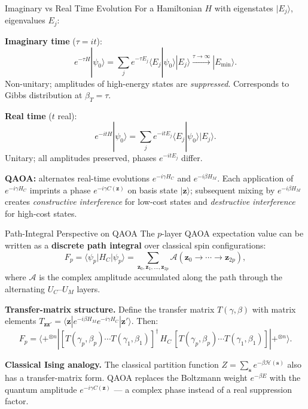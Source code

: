 \documentclass{beamer}
\begin{document}
\begin{frame}
\begin{frame}{Imaginary vs Real Time Evolution}
For a Hamiltonian $H$ with eigenstates $|E_j\rangle$,
eigenvalues $E_j$:

\medskip

\textbf{Imaginary time} ($\tau = it$):
\[
e^{-\tau H}|\psi_0\rangle
= \sum_j e^{-\tau E_j}\langle E_j|\psi_0\rangle|E_j\rangle
\xrightarrow{\tau\to\infty} |E_{\min}\rangle.
\]
Non-unitary; amplitudes of high-energy states are \emph{suppressed}.
Corresponds to Gibbs distribution at $\beta_T = \tau$.

\medskip

\textbf{Real time} ($t$ real):
\[
e^{-itH}|\psi_0\rangle = \sum_j e^{-itE_j}\langle E_j|\psi_0\rangle|E_j\rangle.
\]
Unitary; all amplitudes preserved, phases $e^{-itE_j}$ differ.

\medskip

\textbf{QAOA:} alternates real-time evolutions $e^{-i\gamma H_C}$
and $e^{-i\beta H_M}$.  Each application of $e^{-i\gamma H_C}$
imprints a phase $e^{-i\gamma C(\mathbf{z})}$ on basis state
$|\mathbf{z}\rangle$; subsequent mixing by $e^{-i\beta H_M}$
creates \emph{constructive interference} for low-cost states
and \emph{destructive interference} for high-cost states.
\end{frame}


\begin{frame}{Path-Integral Perspective on QAOA}
The $p$-layer QAOA expectation value can be written as a
\textbf{discrete path integral} over classical spin configurations:
\[
F_p = \langle\psi_p|H_C|\psi_p\rangle
= \sum_{\mathbf{z}_0,\mathbf{z}_1,\dots,\mathbf{z}_{2p}}
  \mathcal{A}(\mathbf{z}_0\to\cdots\to\mathbf{z}_{2p}),
\]
where $\mathcal{A}$ is the complex amplitude accumulated along
the path through the alternating $U_C$--$U_M$ layers.

\medskip

\textbf{Transfer-matrix structure.}  Define the transfer matrix
$T(\gamma,\beta)$ with matrix elements
$T_{\mathbf{z}\mathbf{z}'} = \langle\mathbf{z}|e^{-i\beta H_M}e^{-i\gamma H_C}|\mathbf{z}'\rangle$.
Then:
\[
F_p = \langle{+}^{\otimes n}|
[T(\gamma_p,\beta_p)\cdots T(\gamma_1,\beta_1)]^\dagger\,H_C\,
[T(\gamma_p,\beta_p)\cdots T(\gamma_1,\beta_1)]
|{+}^{\otimes n}\rangle.
\]

\textbf{Classical Ising analogy.} The classical partition function
$Z = \sum_\mathbf{s} e^{-\beta\mathcal{H}(\mathbf{s})}$ also has a
transfer-matrix form. QAOA replaces the Boltzmann weight
$e^{-\beta E}$ with the quantum amplitude $e^{-i\gamma C(\mathbf{z})}$
--- a complex phase instead of a real suppression factor.
\end{frame}



\end{frame}
\end{document}
